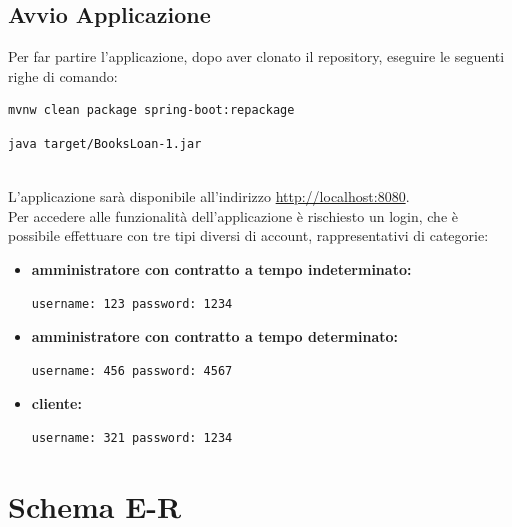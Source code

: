 \documentclass[a4paper,10pt]{article}
\begin{document}
\subsection*{Avvio Applicazione}

Per far partire l'applicazione, dopo aver clonato il repository, eseguire le seguenti righe di comando:\\

\begin{lstlisting}[language=bash]
	mvnw clean package spring-boot:repackage
\end{lstlisting}

\begin{lstlisting}[language=bash]
	java target/BooksLoan-1.jar
\end{lstlisting}

\noindent \\L'applicazione sarà disponibile all'indirizzo \href{http://localhost:8080}{http://localhost:8080}.\\

\noindent Per accedere alle funzionalità dell'applicazione è rischiesto un login, che è possibile effettuare con tre tipi diversi di account, rappresentativi di categorie:

\begin{itemize}
	\item \textbf{amministratore con contratto a tempo indeterminato:}
\begin{lstlisting}[language=bash]
    username: 123 password: 1234
\end{lstlisting}
	\item \textbf{amministratore con contratto a tempo determinato:}
\begin{lstlisting}[language=bash]
    username: 456 password: 4567
\end{lstlisting}
	\item \textbf{cliente:}
\begin{lstlisting}[language=bash]
    username: 321 password: 1234
\end{lstlisting}
\end{itemize}

\section*{Schema E-R}
\end{document}
